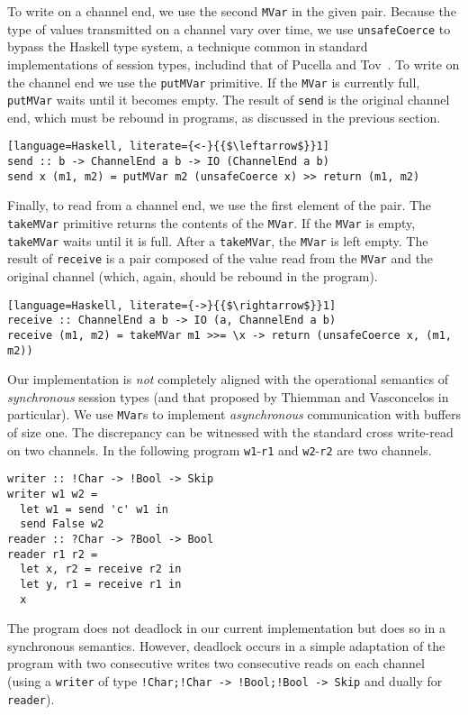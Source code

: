 To write on a channel end, we use the second \lstinline|MVar| in the
given pair. Because the type of values transmitted on a channel vary
over time, we use \lstinline|unsafeCoerce| to bypass the Haskell type
system, a technique common in standard implementations of session
types, includind that of Pucella and
Tov~\cite{DBLP:conf/haskell/PucellaT08}. To write on the channel end
we use the \lstinline|putMVar| primitive. If the \lstinline|MVar| is
currently full, \lstinline|putMVar| waits until it becomes empty.  The
result of \lstinline|send| is the original channel end, which must be
rebound in programs, as discussed in the previous section.
%
\begin{lstlisting}[language=Haskell, literate={<-}{{$\leftarrow$}}1]
send :: b -> ChannelEnd a b -> IO (ChannelEnd a b)
send x (m1, m2) = putMVar m2 (unsafeCoerce x) >> return (m1, m2)
\end{lstlisting}

Finally, to read from a channel end, we use the first element of the
pair. The \lstinline|takeMVar| primitive returns the contents of the
\lstinline|MVar|. If the \lstinline|MVar| is empty,
\lstinline|takeMVar| waits until it is full. After a
\lstinline|takeMVar|, the \lstinline|MVar| is left empty. The result
of \lstinline|receive| is a pair composed of the value read from the
\lstinline|MVar| and the original channel (which, again, should be
rebound in the program).
%
\begin{lstlisting}[language=Haskell, literate={->}{{$\rightarrow$}}1]
receive :: ChannelEnd a b -> IO (a, ChannelEnd a b)
receive (m1, m2) = takeMVar m1 >>= \x -> return (unsafeCoerce x, (m1, m2))
\end{lstlisting}

Our implementation is \emph{not} completely aligned with the
operational semantics of \emph{synchronous} session types (and that
proposed by Thiemman and Vasconcelos in particular). We use
\lstinline|MVar|s to implement \emph{asynchronous} communication with
buffers of size one. The discrepancy can be witnessed with the standard
cross write-read on two channels. In the following program
\lstinline|w1|-\lstinline|r1| and \lstinline|w2|-\lstinline|r2| are
two channels.
%
\begin{lstlisting}
writer :: !Char -> !Bool -> Skip
writer w1 w2 =
  let w1 = send 'c' w1 in
  send False w2
reader :: ?Char -> ?Bool -> Bool
reader r1 r2 =
  let x, r2 = receive r2 in
  let y, r1 = receive r1 in
  x
\end{lstlisting}
%
The program does not deadlock in our current implementation but does
so in a synchronous semantics. However, deadlock occurs in a simple
adaptation of the program with two consecutive writes two consecutive
reads on each channel (using a \lstinline|writer| of type
\lstinline|!Char;!Char -> !Bool;!Bool -> Skip| and dually for
\lstinline|reader|).

